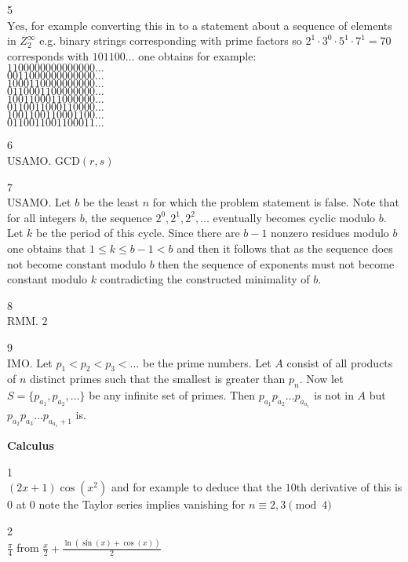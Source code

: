 5 \\
$\boxed{\text{Yes}}$, for example converting this in to a statement about a sequence of elements in $Z_2^{\infty}$ e.g. binary strings corresponding with prime factors so $2^1 \cdot 3^0 \cdot 5^1 \cdot 7^1 = 70$ corresponds with $101100\dots$ one obtains for example: \\
$1100000000000000\dots$ \\
$0011000000000000\dots$ \\
$1000110000000000\dots$ \\
$0110001100000000\dots$ \\
$1001100011000000\dots$ \\
$0110011000110000\dots$ \\
$1001100110001100\dots$ \\
$0110011001100011\dots$

6 \\
USAMO. $\boxed{\text{GCD}(r,s)}$

7 \\
USAMO. Let $b$ be the least $n$ for which the problem statement is false. Note that for all integers $b$, the sequence $2^0, 2^1, 2^2, \dots$ eventually becomes cyclic modulo $b$. Let $k$ be the period of this cycle. Since there are $b-1$ nonzero residues modulo $b$ one obtains that $1 \le k \le b-1 < b$ and then it follows that as the sequence does not become constant modulo $b$ then the sequence of exponents must not become constant modulo $k$ contradicting the constructed minimality of $b$.

8 \\
RMM. $\boxed{2}$

9 \\
IMO. Let $p_1 < p_2 < p_3 < \dots$ be the prime numbers. Let $A$ consist of all products of $n$ distinct primes such that the smallest is greater than $p_n$. Now let $S=\{p_{a_1},p_{a_2},\dots \}$ be any infinite set of primes. Then $p_{a_1}p_{a_2}\dots p_{a_{a_1}}$ is not in $A$ but $p_{a_2}p_{a_3}\dots p_{a_{a_1}+1}$ is.

\newpage

\textbf{Calculus}

1 \\
$\boxed{(2x+1)\cos(x^2)}$ and for example to deduce that the $10$th derivative of this is $0$ at $0$ note the Taylor series implies vanishing for $n \equiv 2,3 \pmod{4}$

2 \\
$\boxed{\frac{\pi}{4}}$ from $\frac{x}{2}+\frac{\ln(\sin(x)+\cos(x))}{2}$

